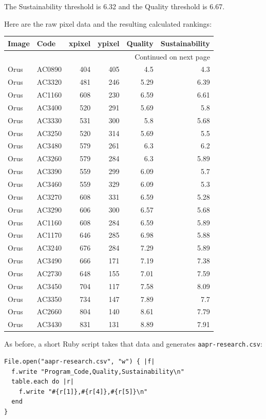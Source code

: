 \documentclass[article,10pt,microtype]{article}
\begin{document}
The Sustainability threshold is 6.32 and the Quality threshold is 6.67.

Here are the raw pixel data and the resulting calculated rankings:

\begin{longtable}{llrrrr}
\label{research}
\\
Image & Code & xpixel & ypixel & Quality & Sustainability\\
\hline
\endhead
\hline\multicolumn{6}{r}{Continued on next page} \\
\endfoot
\endlastfoot
Orus & AC0890 & 404 & 405 & 4.5 & 4.3\\
Orus & AC3320 & 481 & 246 & 5.29 & 6.39\\
Orus & AC1160 & 608 & 230 & 6.59 & 6.61\\
Orus & AC3400 & 520 & 291 & 5.69 & 5.8\\
Orus & AC3330 & 531 & 300 & 5.8 & 5.68\\
Orus & AC3250 & 520 & 314 & 5.69 & 5.5\\
Orus & AC3480 & 579 & 261 & 6.3 & 6.2\\
Orus & AC3260 & 579 & 284 & 6.3 & 5.89\\
Orus & AC3390 & 559 & 299 & 6.09 & 5.7\\
Orus & AC3460 & 559 & 329 & 6.09 & 5.3\\
Orus & AC3270 & 608 & 331 & 6.59 & 5.28\\
Orus & AC3290 & 606 & 300 & 6.57 & 5.68\\
Orus & AC1160 & 608 & 284 & 6.59 & 5.89\\
Orus & AC1170 & 646 & 285 & 6.98 & 5.88\\
Orus & AC3240 & 676 & 284 & 7.29 & 5.89\\
Orus & AC3490 & 666 & 171 & 7.19 & 7.38\\
Orus & AC2730 & 648 & 155 & 7.01 & 7.59\\
Orus & AC3450 & 704 & 117 & 7.58 & 8.09\\
Orus & AC3350 & 734 & 147 & 7.89 & 7.7\\
Orus & AC2660 & 804 & 140 & 8.61 & 7.79\\
Orus & AC3430 & 831 & 131 & 8.89 & 7.91\\
\end{longtable}

As before, a short Ruby script takes that data and generates \texttt{aapr-research.csv}:

\begin{verbatim}
File.open("aapr-research.csv", "w") { |f|
  f.write "Program_Code,Quality,Sustainability\n"
  table.each do |r|
    f.write "#{r[1]},#{r[4]},#{r[5]}\n"
  end
}
\end{verbatim}
\end{document}
